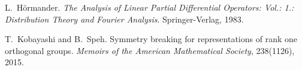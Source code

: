 \documentclass[a4paper,10pt]{article} %
\newcommand{\tmtextit}[1]{{\itshape{#1}}}
\begin{document}
\begin{thebibliography}{Hör83}
  L.~H{\"o}rmander.
  {\newblock}\tmtextit{The Analysis of Linear Partial Differential Operators:
  Vol.: 1.: Distribution Theory and Fourier Analysis}.
  {\newblock}Springer-Verlag, 1983.
  
  T.~Kobayashi and B.~Speh.
  {\newblock}Symmetry breaking for representations of rank one orthogonal
  groups. {\newblock}\tmtextit{Memoirs of the American Mathematical Society},
  238(1126), 2015.
\end{thebibliography}
\end{document}
